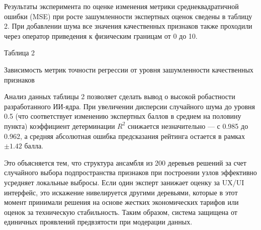 \documentclass[14pt, a4paper]{extarticle}
\begin{document}
Результаты эксперимента по оценке изменения метрики среднеквадратичной ошибки (MSE) при росте зашумленности экспертных оценок сведены в таблицу 2. При добавлении шума все значения качественных признаков также проходили через оператор приведения к физическим границам от 0 до 10.

\begin{flushright}
Таблица 2
\end{flushright}
\begin{center}
Зависимость метрик точности регрессии от уровня зашумленности качественных признаков
\end{center}
\begin{center}
\end{center}

\vspace{1em}

Анализ данных таблицы 2 позволяет сделать вывод о высокой робастности разработанного ИИ-ядра. При увеличении дисперсии случайного шума до уровня 0.5 (что соответствует изменению экспертных баллов в среднем на половину пункта) коэффициент детерминации $R^2$ снижается незначительно --- с 0.985 до 0.962, а средняя абсолютная ошибка предсказания рейтинга остается в рамках $\pm 1.42$ балла. 

Это объясняется тем, что структура ансамбля из 200 деревьев решений за счет случайного выбора подпространства признаков при построении узлов эффективно усредняет локальные выбросы. Если один эксперт занижает оценку за UX/UI интерфейс, это искажение нивелируется другими деревьями, которые в этот момент принимали решения на основе жестких экономических тарифов или оценок за техническую стабильность. Таким образом, система защищена от единичных проявлений предвзятости при модерации данных.
\end{document}
